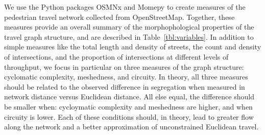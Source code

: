 \documentclass[
  10pt,
]{article}
\begin{document}
We use the Python packages OSMNx \citep{boeing2016OSMnxNew} and Momepy
\citep{fleischmann2019MomepyUrban} to create measures of the pedestrian
travel network collected from OpenStreetMap. Together, these measures
provide an overall summary of the morphophological properties of the
travel graph structure, and are described in Table~\ref{tbl:variables}.
In addition to simple measures like the total length and density of
streets, the count and density of intersections, and the proportion of
intersections at different levels of throughput, we focus in particular
on three measures of the graph structure: cyclomatic complexity,
meshedness, and circuity. In theory, all three measures should be
related to the observed difference in segregation when measured in
network distance versus Euclidean distance. All else equal, the
difference should be smaller when: cycloymatic complexity and meshedness
are higher, and when circuity is lower. Each of these conditions should,
in theory, lead to greater flow along the network and a better
approximation of unconstrained Euclidean travel.
\end{document}
